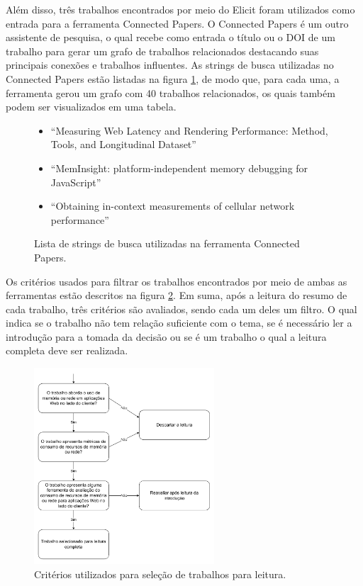\documentclass[12pt]{tcc}
\begin{document}
Além disso, três trabalhos encontrados por meio do Elicit foram utilizados como entrada para a ferramenta Connected Papers.
O Connected Papers é um outro assistente de pesquisa, o qual recebe como entrada o título ou o DOI de um trabalho para gerar um grafo de trabalhos relacionados destacando suas principais conexões e trabalhos influentes.
As strings de busca utilizadas no Connected Papers estão listadas na figura \ref{tab:connected-papers}, de modo que, para cada uma, a ferramenta gerou um grafo com 40 trabalhos relacionados, os quais também podem ser visualizados em uma tabela.

\begin{figure}
	\centering
	\caption{Lista de strings de busca utilizadas na ferramenta Connected Papers.}
	\begin{minipage}{0.6\textwidth}
	    \begin{itemize}
			\item ``Measuring Web Latency and Rendering Performance: Method, Tools, and Longitudinal Dataset''
			\item ``MemInsight: platform-independent memory debugging for JavaScript''
			\item ``Obtaining in-context measurements of cellular network performance''
	    \end{itemize}
	\end{minipage}
	\label{tab:connected-papers}
\end{figure}

Os critérios usados para filtrar os trabalhos encontrados por meio de ambas as ferramentas estão descritos na figura \ref{fig:fluxo-leitura}.
Em suma, após a leitura do resumo de cada trabalho, três critérios são avaliados, sendo cada um deles um filtro.
O qual indica se o trabalho não tem relação suficiente com o tema, se é necessário ler a introdução para a tomada da decisão ou se é um trabalho o qual a leitura completa deve ser realizada.

\begin{figure}[!ht]
	\centering
	\includegraphics[width=0.6\textwidth]{figures/fluxo-decisao-leitura.pdf}
	\caption{Critérios utilizados para seleção de trabalhos para leitura.}
	\label{fig:fluxo-leitura}
\end{figure}
\end{document}
